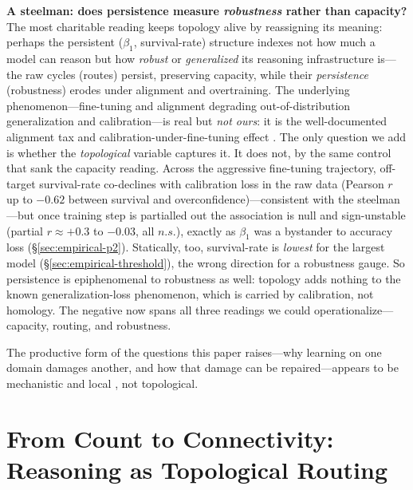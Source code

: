 \documentclass{article}
\begin{document}
\medskip
\noindent\textbf{A steelman: does persistence measure \emph{robustness} rather than capacity?}
The most charitable reading keeps topology alive by reassigning its meaning: perhaps the persistent
($\beta_1$, survival-rate) structure indexes not how much a model can reason but how \emph{robust} or
\emph{generalized} its reasoning infrastructure is---the raw cycles (routes) persist, preserving
capacity, while their \emph{persistence} (robustness) erodes under alignment and overtraining. The
underlying phenomenon---fine-tuning and alignment degrading out-of-distribution generalization and
calibration---is real but \emph{not ours}: it is the well-documented alignment tax and
calibration-under-fine-tuning effect \citep{calibrationCF,Shenfeld2025RLRazor}. The only question we
add is whether the \emph{topological} variable captures it. It does not, by the same control that
sank the capacity reading. Across the aggressive fine-tuning trajectory, off-target survival-rate
co-declines with calibration loss in the raw data (Pearson $r$ up to $-0.62$ between survival and
overconfidence)---consistent with the steelman---but once training step is partialled out the
association is null and sign-unstable (partial $r \approx +0.3$ to $-0.03$, all $n.s.$), exactly as
$\beta_1$ was a bystander to accuracy loss (\S\ref{sec:empirical-p2}). Statically, too, survival-rate
is \emph{lowest} for the largest model (\S\ref{sec:empirical-threshold}), the wrong direction for a
robustness gauge. So persistence is epiphenomenal to robustness as well: topology adds nothing to the
known generalization-loss phenomenon, which is carried by calibration, not homology. The negative now
spans all three readings we could operationalize---capacity, routing, and robustness.

\medskip
\noindent The productive form of the questions this paper raises---why learning on one
domain damages another, and how that damage can be repaired---appears to be mechanistic and
local \citep{Yang2026localrl}, not topological.


\section{From Count to Connectivity: Reasoning as Topological Routing}
\label{sec:routing-theory}
\end{document}
